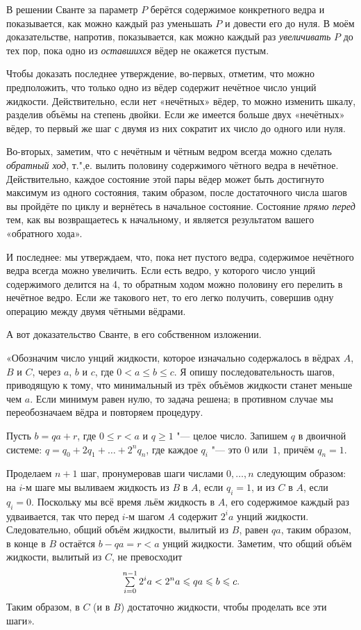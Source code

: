 \documentclass[twoside]{book}
\begin{document}
\medskip

В решении Сванте за параметр $P$ берётся содержимое конкретного ведра и показывается, как можно каждый раз уменьшать $P$ и довести его до нуля.
В моём доказательстве, напротив, показывается, как можно каждый раз \emph{увеличивать} $P$ до тех пор, пока одно из \emph{оставшихся} вёдер не окажется пустым.

Чтобы доказать последнее утверждение, во-первых, отметим, что можно предположить, что только одно из вёдер содержит нечётное число унций жидкости.
Действительно, если нет «нечётных» вёдер, то можно изменить шкалу, разделив объёмы на степень двойки.
Если же имеется больше двух «нечётных» вёдер, то первый же шаг с двумя из них сократит их число до одного или нуля.

Во-вторых, заметим, что с нечётным и чётным ведром всегда можно сделать \emph{обратный ход}, т.",е. вылить половину содержимого чётного ведра в нечётное.
Действительно, каждое состояние этой пары вёдер может быть достигнуто максимум из одного состояния, таким образом, после достаточного числа шагов вы пройдёте по циклу и вернётесь в начальное состояние.
Состояние \emph{прямо перед} тем, как вы возвращаетесь к начальному, и является результатом вашего «обратного хода».

И последнее: мы утверждаем, что, пока нет пустого ведра, содержимое нечётного ведра всегда можно увеличить.
Если есть ведро, у которого число унций содержимого делится на 4, то обратным ходом можно половину его перелить в нечётное ведро.
Если же такового нет, то его легко получить, совершив одну операцию между двумя чётными вёдрами.
\heart

А вот доказательство Сванте, в его собственном изложении.

\medskip

«Обозначим число унций жидкости, которое изначально содержалось в вёдрах $A$, $B$ и $C$, через $a$, $b$ и $c$, где $0<a\le b\le c$.
Я опишу последовательность шагов, приводящую к тому, что минимальный из трёх объёмов жидкости станет меньше чем $a$.
Если минимум равен нулю, то задача решена; в противном случае мы переобозначаем вёдра и повторяем процедуру.

Пусть $b = qa + r$, где $0\le r<a$ и $q\ge 1$ "--- целое число.
Запишем $q$ в двоичной системе: $q=q_0+2q_1+\ldots+2^nq_n$, где каждое $q_i$ "--- это $0$ или~$1$, причём $q_n = 1$.

Проделаем $n+1$ шаг, пронумеровав шаги числами $0,\dots, n$ следующим образом: на $i$-м шаге  мы выливаем жидкость из $B$ в $A$, если $q_i = 1$, и из $C$ в $A$, если $q_i = 0$.
Поскольку мы всё время льём жидкость в $A$, его содержимое каждый раз удваивается, так что  перед $i$-м шагом $A$ содержит $2^ia$ унций жидкости.
Следовательно, общий объём жидкости, вылитый из $B$, равен $qa$, таким образом, в конце  в $B$ остаётся $b-qa=r<a$ унций жидкости.
Заметим, что общий объём жидкости, вылитый из $C$, не превосходит
\[
  \mathop{\textstyle\sum}\limits_{i=0}^{n-1} 2^ia<2^na\leqslant qa\leqslant b\leqslant c.\]
Таким образом, в $C$ (и в $B$) достаточно жидкости, чтобы проделать все эти шаги».
\heart
\end{document}
